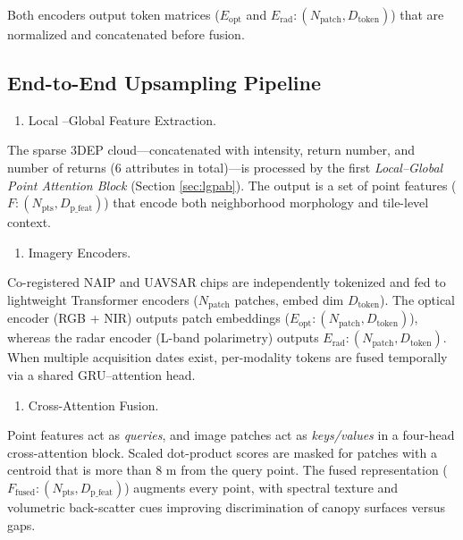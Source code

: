 \documentclass[12pt]{report}
\begin{document}
Both encoders output token matrices ($E_{\text{opt}}$ and $E_{\text{rad}}: (N_{\text{patch}}, D_{\text{token}})$) that are normalized and concatenated before fusion.

\subsection{End-to-End Upsampling Pipeline}
\label{sec:pipeline}


\begin{enumerate}
\item[(1)] {Local
–Global Feature Extraction.}
\end{enumerate}

The sparse 3DEP cloud—concatenated with intensity, return number, and number of returns (6 attributes in total)—is processed by the first \emph{Local–Global Point Attention Block} (Section \ref{sec:lgpab}). The output is a set of point features ($F: (N_{\text{pts}}, D_{\text{p\_feat}})$) that encode both neighborhood morphology and tile-level context.


\begin{enumerate}
\item[(2)] {Imagery Encoders.}
\end{enumerate}

Co-registered NAIP and UAVSAR chips are independently tokenized and fed to lightweight Transformer encoders ($N_{\text{patch}}$ patches, embed dim $D_{\text{token}}$). The optical encoder (RGB + NIR) outputs patch embeddings ($E_{\text{opt}}: (N_{\text{patch}}, D_{\text{token}})$), whereas the radar encoder (L-band polarimetry) outputs $E_{\text{rad}}: (N_{\text{patch}}, D_{\text{token}})$. When multiple acquisition dates exist, per-modality tokens are fused temporally via a shared GRU–attention head.

\begin{enumerate}
\item[(3)] {Cross-Attention Fusion.}
\end{enumerate}

Point features act as \emph{queries}, and image patches act as \emph{keys/values}
in a four-head cross-attention block.
Scaled dot-product scores are masked for patches with a centroid that is more than 8 m from the query point. The fused representation ($F_{\text{fused}}: (N_{\text{pts}}, D_{\text{p\_feat}})$) augments every point, with spectral texture and volumetric back-scatter cues improving discrimination of canopy surfaces versus gaps.
\end{document}
